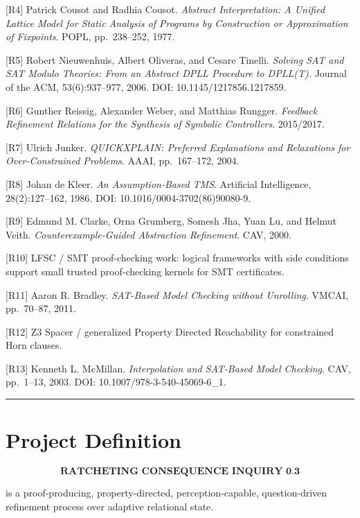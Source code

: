 \documentclass[
]{article}
\begin{document}
{[}R4{]} Patrick Cousot and Radhia Cousot. \emph{Abstract
Interpretation: A Unified Lattice Model for Static Analysis of Programs
by Construction or Approximation of Fixpoints}. POPL, pp.~238--252,
1977.

{[}R5{]} Robert Nieuwenhuis, Albert Oliveras, and Cesare Tinelli.
\emph{Solving SAT and SAT Modulo Theories: From an Abstract DPLL
Procedure to DPLL(T).} Journal of the ACM, 53(6):937--977, 2006. DOI:
10.1145/1217856.1217859.

{[}R6{]} Gunther Reissig, Alexander Weber, and Matthias Rungger.
\emph{Feedback Refinement Relations for the Synthesis of Symbolic
Controllers}. 2015/2017.

{[}R7{]} Ulrich Junker. \emph{QUICKXPLAIN: Preferred Explanations and
Relaxations for Over-Constrained Problems}. AAAI, pp.~167--172, 2004.

{[}R8{]} Johan de Kleer. \emph{An Assumption-Based TMS}. Artificial
Intelligence, 28(2):127--162, 1986. DOI: 10.1016/0004-3702(86)90080-9.

{[}R9{]} Edmund M. Clarke, Orna Grumberg, Somesh Jha, Yuan Lu, and
Helmut Veith. \emph{Counterexample-Guided Abstraction Refinement}. CAV,
2000.

{[}R10{]} LFSC / SMT proof-checking work: logical frameworks with side
conditions support small trusted proof-checking kernels for SMT
certificates.

{[}R11{]} Aaron R. Bradley. \emph{SAT-Based Model Checking without
Unrolling}. VMCAI, pp.~70--87, 2011.

{[}R12{]} Z3 Spacer / generalized Property Directed Reachability for
constrained Horn clauses.

{[}R13{]} Kenneth L. McMillan. \emph{Interpolation and SAT-Based Model
Checking}. CAV, pp.~1--13, 2003. DOI: 10.1007/978-3-540-45069-6\_1.

\begin{center}\rule{0.5\linewidth}{0.5pt}\end{center}

\section{Project Definition}\label{project-definition}

\[
\boxed{
\textbf{RATCHETING CONSEQUENCE INQUIRY 0.3}
}
\]

is a proof-producing, property-directed, perception-capable,
question-driven refinement process over adaptive relational state.
\end{document}
